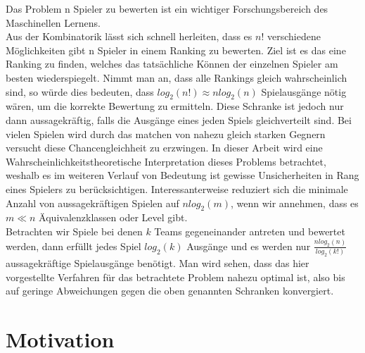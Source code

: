 \documentclass[12pt,a4paper]{scrartcl}
\numberwithin{equation}{section}
\begin{document}
Das Problem n Spieler zu bewerten ist ein wichtiger Forschungsbereich des Maschinellen Lernens. \\
Aus der Kombinatorik lässt sich schnell herleiten, dass es $n!$ verschiedene Möglichkeiten gibt n Spieler in einem Ranking zu bewerten. 
Ziel ist es das eine Ranking zu finden, welches das tatsächliche Können der einzelnen Spieler am besten wiederspiegelt. 
Nimmt man an, dass alle Rankings gleich wahrscheinlich sind, so würde dies bedeuten, dass $log_{2}(n!) \approx nlog_{2}(n)$ Spielausgänge nötig wären, um die 
korrekte Bewertung zu ermitteln. 
Diese Schranke ist jedoch nur dann aussagekräftig, falls die Ausgänge eines jeden Spiels gleichverteilt sind. Bei vielen Spielen wird durch das matchen von nahezu gleich
starken Gegnern versucht diese Chancengleichheit zu erzwingen. In dieser Arbeit wird eine Wahrscheinlichkeitstheoretische Interpretation dieses Problems betrachtet, weshalb es 
im weiteren Verlauf von Bedeutung ist gewisse Unsicherheiten in Rang eines Spielers zu berücksichtigen. Interessanterweise reduziert sich die minimale Anzahl von aussagekräftigen
Spielen auf $nlog_{2}(m)$, wenn wir annehmen, dass es $m \ll n$ Äquivalenzklassen oder Level gibt. \\
Betrachten wir Spiele bei denen $k$ Teams gegeneinander antreten und bewertet werden, dann erfüllt jedes Spiel $log_{2}(k)$ Ausgänge und es werden nur $\frac{nlog_{2}(n)}{log_{2}(k!)}$
aussagekräftige Spielausgänge benötigt. 
Man wird sehen, dass das hier vorgestellte Verfahren für das betrachtete Problem nahezu optimal ist, also bis auf geringe Abweichungen gegen die oben genannten Schranken konvergiert. 

\section{Motivation}
\end{document}
